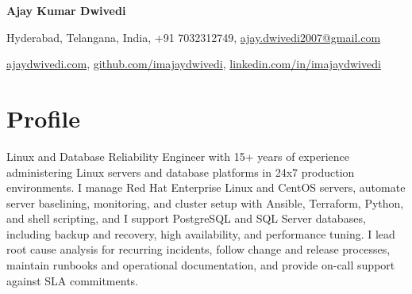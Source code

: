 \documentclass[10pt,a4paper]{article}
\begin{document}
\begin{center}
{\Huge\bfseries Ajay Kumar Dwivedi}

\vspace{6pt}
Hyderabad, Telangana, India, +91 7032312749, \href{mailto:ajay.dwivedi2007@gmail.com}{ajay.dwivedi2007@gmail.com}

\vspace{2pt}
\href{https://ajaydwivedi.com/}{ajaydwivedi.com}, \href{https://github.com/imajaydwivedi}{github.com/imajaydwivedi}, \href{https://linkedin.com/in/imajaydwivedi/}{linkedin.com/in/imajaydwivedi}
\end{center}

\section{Profile}
Linux and Database Reliability Engineer with 15+ years of experience administering Linux servers and database platforms in 24x7 production environments. I manage Red Hat Enterprise Linux and CentOS servers, automate server baselining, monitoring, and cluster setup with Ansible, Terraform, Python, and shell scripting, and I support PostgreSQL and SQL Server databases, including backup and recovery, high availability, and performance tuning. I lead root cause analysis for recurring incidents, follow change and release processes, maintain runbooks and operational documentation, and provide on-call support against SLA commitments.
\end{document}
